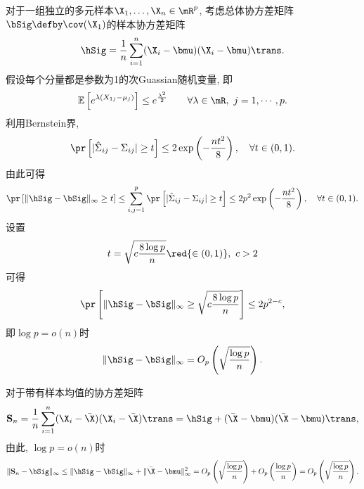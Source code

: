 \begin{exm}
    对于一组独立的多元样本$\X_1,\ldots,\X_n \in \mR^p$, 考虑总体协方差矩阵$\bSig \defby \cov(\X_1)$的样本协方差矩阵
    \begin{align*}
        \hSig=\frac{1}{n}\sum_{i=1}^n (\X_i-\bmu)(\X_i-\bmu)\trans.
    \end{align*}
    假设每个分量都是参数为1的次Guassian随机变量, 即
    \begin{align*}
        \E\left[e^{\lambda (X_{1j}-\mu_j)}\right] \leq e^{\frac{\lambda^{2}}{2}} \qquad \forall \lambda \in \mR,~j=1,\cdots,p.
    \end{align*}
    利用Bernstein界,
    \begin{align*}
        \pr\left[|\hat{\Sigma}_{ij}-\Sigma_{ij}| \geq t\right] \leq 2 \exp\left( -\frac{nt^2}{8}\right), \quad \forall t \in(0,1).
      \end{align*}
      由此可得
     \begin{align*}
        \pr\left[\|\hSig-\bSig\|_\infty \geq t  \right] \leq \sum_{i,j=1}^p   \pr\left[|\hat{\Sigma}_{ij}-\Sigma_{ij}| \geq t\right] \leq 2 p^2 \exp\left( -\frac{nt^2}{8}\right), \quad \forall t \in(0,1).
     \end{align*} 
     设置
     \begin{align*}
        t=\sqrt{c \frac{8\log p}{n}} \red{\in(0,1)},~c>2
     \end{align*}
     可得
     \begin{align*}
        \pr\left[\|\hSig-\bSig\|_\infty \geq  \sqrt{c \frac{8\log p}{n}} \right] \leq 2p^{2-c},
     \end{align*}
    即$\log p=o(n)$时
    \begin{align*}
        \|\hSig-\bSig\|_\infty=O_p\left( \sqrt{\frac{\log p}{n}}  \right). 
    \end{align*}
    \end{exm}
\begin{remark}
    对于带有样本均值的协方差矩阵
    \begin{align*}
        \S_n=\frac{1}{n}\sum_{i=1}^n (\X_i-\bar{\X})(\X_i-\bar{\X})\trans=\hSig+(\bar{\X}-\bmu)(\bar{\X}-\bmu)\trans,
    \end{align*}
由此, $\log p=o(n)$时
\begin{align*}
    \|\S_n-\bSig\|_\infty \leq \|\hSig-\bSig\|_\infty+\|\bar{\X}-\bmu\|^2_\infty=O_p\left( \sqrt{\frac{\log p}{n}}  \right)+O_p\left(\frac{\log p}{n}  \right)=O_p\left( \sqrt{\frac{\log p}{n}}  \right).
\end{align*}
\end{remark}


